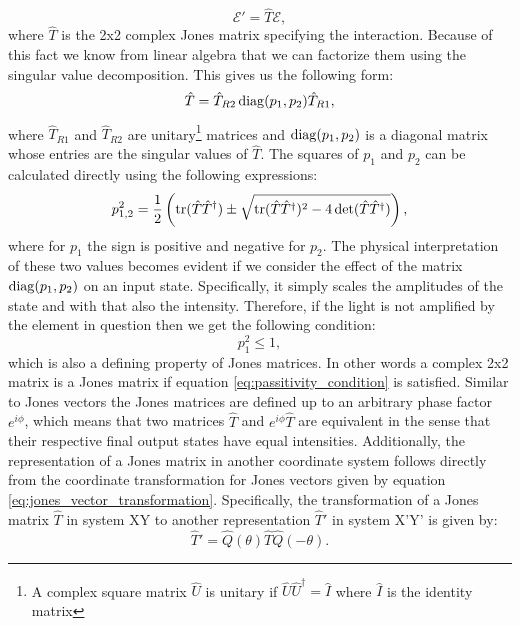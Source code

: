 \begin{equation}
    \bm{\mathcal{E}}' = \hat{T} \bm{\mathcal{E}},
\end{equation}
where $\hat{T}$ is the 2x2 complex Jones matrix specifying the interaction. Because of this fact we know from linear algebra that we can factorize them using the singular value decomposition. This gives us the following form:
\begin{equation}
    \label{eq:jones_singular_value_decomposition}
    \hat{T} = \hat{T}_{R2}\operatorname{diag}(p_1, p_2)\hat{T}_{R1},
\end{equation}
where $\hat{T}_{R1}$ and $\hat{T}_{R2}$ are unitary\footnote{A complex square matrix $\hat{U}$ is unitary if $\hat{U} \hat{U}^\dagger=\hat{I}$ where $\hat{I}$ is the identity matrix} matrices and $\operatorname{diag}(p_1, p_2)$ is a diagonal matrix whose entries are the singular values of $\hat{T}$. The squares of $p_1$ and $p_2$ can be calculated directly using the following expressions:
\begin{equation}
    p_{1,2}^2 = \frac{1}{2}\left(\operatorname{tr}(\hat{T}\hat{T}^{\dagger}) \pm 
    \sqrt{\operatorname{tr}(\hat{T}\hat{T}^{\dagger})^2-4\det(\hat{T}\hat{T}^{\dagger})}\right),
\end{equation}
where for $p_1$ the sign is positive and negative for $p_2$. The physical interpretation of these two values becomes evident if we consider the effect of the matrix $\operatorname{diag}(p_1, p_2)$ on an input state. Specifically, it simply scales the amplitudes of the state and with that also the intensity. Therefore, if the light is not amplified by the element in question then we get the following condition:
\begin{equation}
    \label{eq:passitivity_condition}
    p_1^2 \leq 1,
\end{equation}
which is also a defining property of Jones matrices. In other words a complex 2x2 matrix is a Jones matrix if equation \ref{eq:passitivity_condition} is satisfied. Similar to Jones vectors the Jones matrices are defined up to an arbitrary phase factor $e^{i\phi}$, which means that two matrices $\hat{T}$ and $e^{i\phi}\hat{T}$ are equivalent in the sense that their respective final output states have equal intensities. Additionally, the representation of a Jones matrix in another coordinate system follows directly from the coordinate transformation for Jones vectors given by equation \ref{eq:jones_vector_transformation}. Specifically, the transformation of a Jones matrix $\hat{T}$ in system XY to another representation $\hat{T}'$ in system X'Y' is given by:
\begin{equation}
    \label{eq:jones_matrix_transformation}
    \hat{T}' = \hat{Q}(\theta)\hat{T}\hat{Q}(-\theta).
\end{equation}
